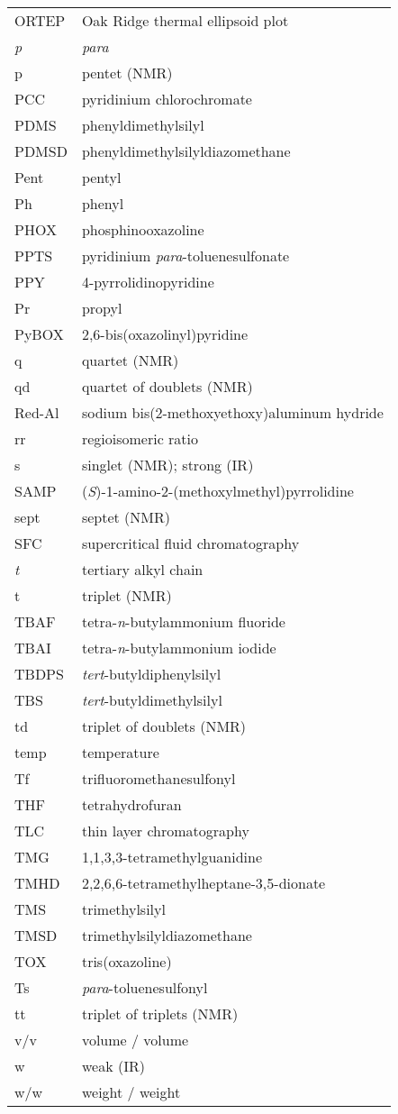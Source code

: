 {\begin{supertabular}{p{1.5in}l}
ORTEP&Oak Ridge thermal ellipsoid plot\\
\textit{p}&\textit{para} \\
p&pentet (NMR)\\
PCC&pyridinium chlorochromate\\
PDMS&phenyldimethylsilyl\\
PDMSD&phenyldimethylsilyldiazomethane\\
Pent&pentyl\\
Ph&phenyl\\
PHOX&phosphinooxazoline\\
PPTS&pyridinium \textit{para}-toluenesulfonate\\
PPY&4-pyrrolidinopyridine\\
Pr&propyl\\
PyBOX&2,6-bis(oxazolinyl)pyridine\\
q&quartet (NMR)\\
qd & quartet of doublets (NMR) \\
Red-Al&sodium bis(2-methoxyethoxy)aluminum hydride\\
rr & regioisomeric ratio \\
s&singlet (NMR); strong (IR)\\
SAMP&(\textit{S})-1-amino-2-(methoxylmethyl)pyrrolidine\\
sept&septet (NMR) \\
SFC&supercritical fluid chromatography\\
\textit{t}&tertiary alkyl chain \\
t & triplet (NMR)\\
TBAF&tetra-\textit{n}-butylammonium fluoride\\
TBAI&tetra-\textit{n}-butylammonium iodide\\
TBDPS&\textit{tert}-butyldiphenylsilyl\\
TBS&\textit{tert}-butyldimethylsilyl\\
td & triplet of doublets (NMR) \\
temp & temperature \\
Tf&trifluoromethanesulfonyl\\
THF&tetrahydrofuran\\
TLC&thin layer chromatography\\
TMG&1,1,3,3-tetramethylguanidine\\
TMHD&2,2,6,6-tetramethylheptane-3,5-dionate\\
TMS&trimethylsilyl\\
TMSD&trimethylsilyldiazomethane\\
TOX&tris(oxazoline)\\
Ts&\textit{para}-toluenesulfonyl\\
tt&triplet of triplets (NMR)\\
v/v&volume / volume\\
w&weak (IR)\\
w/w&weight / weight\\
\end{supertabular}
}